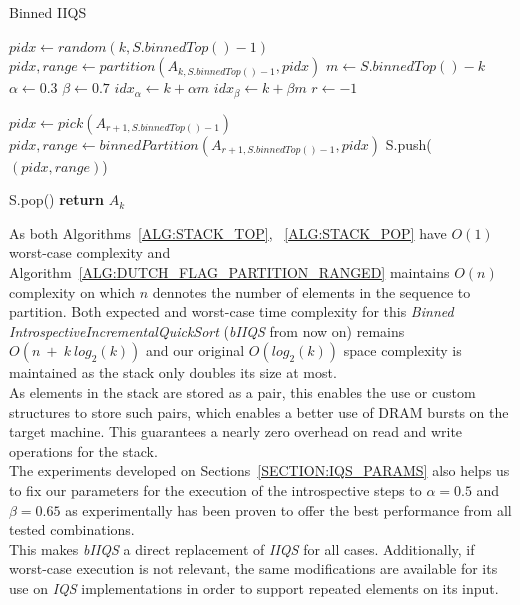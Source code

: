 \begin{algorithm}
  \begin{algorithmic}[1]
    \caption{Binned IIQS} \label{ALG:RANGED_IIQS}
        \State $pidx \gets random(k,S.binnedTop()-1)$
        \State $pidx, range \gets partition(A_{k,S.binnedTop()-1}, pidx)$
        \State $m \gets S.binnedTop() - k$
        \State $\alpha \gets 0.3$
        \State $\beta \gets 0.7$
        \State $idx_\alpha \gets k + \alpha m$
        \State $idx_\beta \gets k + \beta m$
        \State $r \gets -1$

            \State $pidx \gets pick(A_{r+1,S.binnedTop()-1})$
            \State $pidx, range \gets binnedPartition(A_{r+1,S.binnedTop()-1},pidx)$
        \EndIf
        \State S.push($(pidx, range)$)

    \EndWhile
    \State S.pop()
    \State \textbf{return} $A_{k}$\label{IIQS_main_cycle}
    \EndProcedure
  \end{algorithmic}
\end{algorithm}

As both Algorithms~\ref{ALG:STACK_TOP}, ~\ref{ALG:STACK_POP} have $O(1)$ worst-case complexity and Algorithm~\ref{ALG:DUTCH_FLAG_PARTITION_RANGED} maintains $O(n)$ complexity on which $n$ dennotes the number of elements in the sequence to partition. Both expected and worst-case time complexity for this \emph{Binned IntrospectiveIncrementalQuickSort} (\emph{bIIQS} from now on) remains $O(n~+~k~log_2(k))$ and our original $O(log_2(k))$ space complexity is maintained as the stack only doubles its size at most.\\

As elements in the stack are stored as a pair, this enables the use or custom structures to store such pairs, which enables a better use of DRAM bursts on the target machine. This guarantees a nearly zero overhead on read and write operations for the stack.\\

The experiments developed on Sections~\ref{SECTION:IQS_PARAMS} also helps us to fix our parameters for the execution of the introspective steps to $\alpha=0.5$ and $\beta=0.65$ as experimentally has been proven to offer the best performance from all tested combinations.\\

This makes \emph{bIIQS} a direct replacement of \emph{IIQS} for all cases. Additionally, if worst-case execution is not relevant, the same modifications are available for its use on \emph{IQS} implementations in order to support repeated elements on its input.\\

